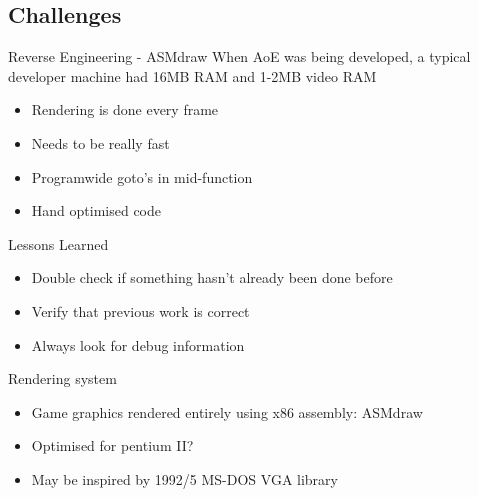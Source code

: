 \documentclass{beamer}
\begin{document}

\subsection{Challenges}

\begin{frame}{Reverse Engineering - ASMdraw}
	When AoE was being developed, a typical developer machine had 16MB RAM and 1-2MB video RAM
	\begin{itemize}
		\item Rendering is done every frame
		\item Needs to be really fast
		\item Programwide goto's in mid-function
		\item Hand optimised code
	\end{itemize}
\end{frame}


\begin{frame}{Lessons Learned}
	\begin{itemize}
		\item Double check if something hasn't already been done before
		\item Verify that previous work is correct
		\item Always look for debug information
	\end{itemize}

\end{frame}


\begin{frame}{Rendering system}
	\begin{itemize}
		\item Game graphics rendered entirely using x86 assembly: ASMdraw
		\item Optimised for pentium II?
		\item May be inspired by 1992/5 MS-DOS VGA library
	\end{itemize}

\end{frame}
\end{document}
